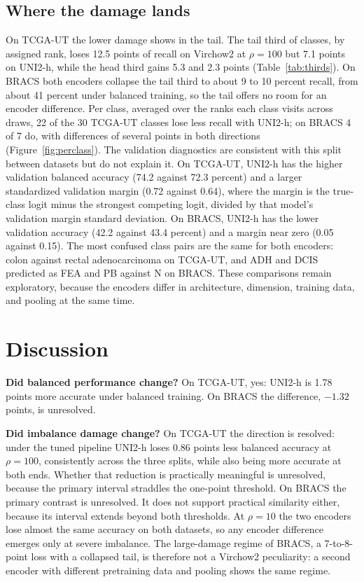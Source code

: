 \subsection{Where the damage lands}
On TCGA-UT the lower damage shows in the tail. The tail third of classes, by assigned rank, loses 12.5 points of recall on Virchow2 at $\rho=100$ but 7.1 points on UNI2-h, while the head third gains 5.3 and 2.3 points (Table~\ref{tab:thirds}). On BRACS both encoders collapse the tail third to about 9 to 10 percent recall, from about 41 percent under balanced training, so the tail offers no room for an encoder difference. Per class, averaged over the ranks each class visits across draws, 22 of the 30 TCGA-UT classes lose less recall with UNI2-h; on BRACS 4 of 7 do, with differences of several points in both directions (Figure~\ref{fig:perclass}). The validation diagnostics are consistent with this split between datasets but do not explain it. On TCGA-UT, UNI2-h has the higher validation balanced accuracy (74.2 against 72.3 percent) and a larger standardized validation margin (0.72 against 0.64), where the margin is the true-class logit minus the strongest competing logit, divided by that model's validation margin standard deviation. On BRACS, UNI2-h has the lower validation accuracy (42.2 against 43.4 percent) and a margin near zero (0.05 against 0.15). The most confused class pairs are the same for both encoders: colon against rectal adenocarcinoma on TCGA-UT, and ADH and DCIS predicted as FEA and PB against N on BRACS. These comparisons remain exploratory, because the encoders differ in architecture, dimension, training data, and pooling at the same time.

\section{Discussion}
\label{sec:discussion}
\textbf{Did balanced performance change?} On TCGA-UT, yes: UNI2-h is 1.78 points more accurate under balanced training. On BRACS the difference, $-1.32$ points, is unresolved.

\textbf{Did imbalance damage change?} On TCGA-UT the direction is resolved: under the tuned pipeline UNI2-h loses 0.86 points less balanced accuracy at $\rho=100$, consistently across the three splits, while also being more accurate at both ends. Whether that reduction is practically meaningful is unresolved, because the primary interval straddles the one-point threshold. On BRACS the primary contrast is unresolved. It does not support practical similarity either, because its interval extends beyond both thresholds. At $\rho=10$ the two encoders lose almost the same accuracy on both datasets, so any encoder difference emerges only at severe imbalance. The large-damage regime of BRACS, a 7-to-8-point loss with a collapsed tail, is therefore not a Virchow2 peculiarity: a second encoder with different pretraining data and pooling shows the same regime.

